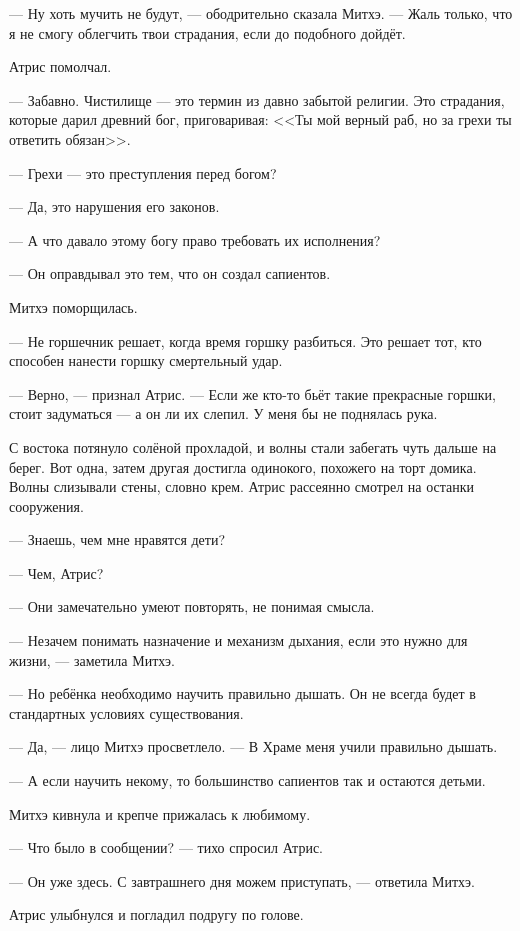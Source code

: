 --- Ну хоть мучить не будут, --- ободрительно сказала Митхэ.
--- Жаль только, что я не смогу облегчить твои страдания, если до подобного дойдёт.

Атрис помолчал.

--- Забавно.
Чистилище --- это термин из давно забытой религии.
Это страдания, которые дарил древний бог, приговаривая: <<Ты мой верный раб, но за грехи ты ответить обязан>>.

--- Грехи --- это преступления перед богом?

--- Да, это нарушения его законов.

--- А что давало этому богу право требовать их исполнения?

--- Он оправдывал это тем, что он создал сапиентов.

Митхэ поморщилась.

--- Не горшечник решает, когда время горшку разбиться.
Это решает тот, кто способен нанести горшку смертельный удар.

--- Верно, --- признал Атрис.
--- Если же кто-то бьёт такие прекрасные горшки, стоит задуматься --- а он ли их слепил.
У меня бы не поднялась рука.

С востока потянуло солёной прохладой, и волны стали забегать чуть дальше на берег.
Вот одна, затем другая достигла одинокого, похожего на торт домика.
Волны слизывали стены, словно крем.
Атрис рассеянно смотрел на останки сооружения.

--- Знаешь, чем мне нравятся дети?

--- Чем, Атрис?

--- Они замечательно умеют повторять, не понимая смысла.

--- Незачем понимать назначение и механизм дыхания, если это нужно для жизни, --- заметила Митхэ.

--- Но ребёнка необходимо научить правильно дышать.
Он не всегда будет в стандартных условиях существования.

--- Да, --- лицо Митхэ просветлело.
--- В Храме меня учили правильно дышать.

--- А если научить некому, то большинство сапиентов так и остаются детьми.

Митхэ кивнула и крепче прижалась к любимому.

--- Что было в сообщении? --- тихо спросил Атрис.

--- Он уже здесь.
С завтрашнего дня можем приступать, --- ответила Митхэ.

Атрис улыбнулся и погладил подругу по голове.

